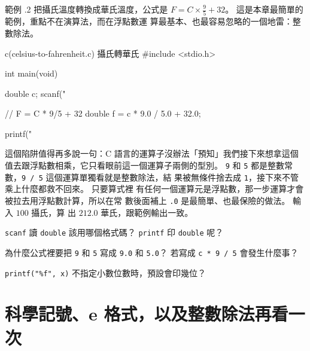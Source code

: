 
範例 \thechapter.2 把攝氏溫度轉換成華氏溫度，公式是 $F = C \times
\frac{9}{5} + 32$。 這是本章最簡單的範例，重點不在演算法，而在浮點數運
算最基本、也最容易忽略的一個地雷：整數除法。

\begin{example}{c}{(celsius-to-fahrenheit.c) 攝氏轉華氏}
#include <stdio.h>

int main(void) {
    double c;
    scanf("%

    // F = C * 9/5 + 32
    double f = c * 9.0 / 5.0 + 32.0;

    printf("%
}
\end{example}



這個陷阱值得再多說一句：C 語言的運算子沒辦法「預知」我們接下來想拿這個
值去跟浮點數相乘，它只看眼前這一個運算子兩側的型別。 \texttt{9} 和
\texttt{5} 都是整數常數，\texttt{9 / 5} 這個運算單獨看就是整數除法，結
果被無條件捨去成 \texttt{1}，接下來不管乘上什麼都救不回來。 只要算式裡
有任何一個運算元是浮點數，那一步運算才會被拉去用浮點數計算，所以在常
數後面補上 \texttt{.0} 是最簡單、也最保險的做法。 輸入 $100$ 攝氏，算
出 $212.0$ 華氏，跟範例輸出一致。

\begin{drills}[label=drills:float-declare-io]
\item \texttt{scanf} 讀 \texttt{double} 該用哪個格式碼？ \texttt{printf}
印 \texttt{double} 呢？
\item 為什麼公式裡要把 \texttt{9} 和 \texttt{5} 寫成 \texttt{9.0} 和
\texttt{5.0}？ 若寫成 \texttt{c * 9 / 5} 會發生什麼事？
\item \texttt{printf("\%f", x)} 不指定小數位數時，預設會印幾位？
\end{drills}

\section{科學記號、e 格式，以及整數除法再看一次}
\label{sec:float-sci-notation}

